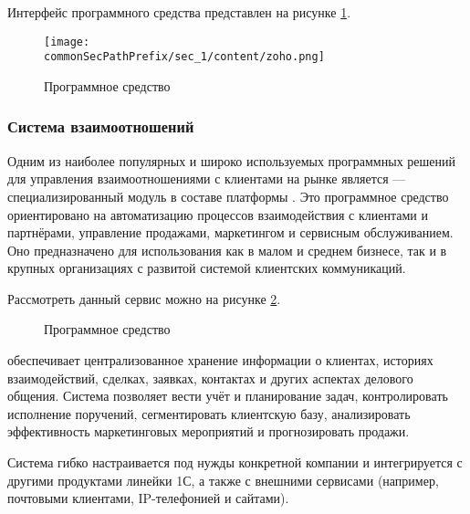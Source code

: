 Интерфейс программного средства представлен на рисунке \ref{fig:zoho}.

\begin{figure}[ht]
    \centering
    \texttt{[image: \\commonSecPathPrefix/sec\_1/content/zoho.png]}
    \caption{Программное средство \analogZoho}
    \label{fig:zoho}
\end{figure}

\subsubsection{Система взаимоотношений \analogOneC}

Одним из наиболее популярных и широко используемых программных решений для управления взаимоотношениями с клиентами на 
рынке является {\analogOneC} — специализированный модуль в составе платформы \analogOneCMain. Это программное средство ориентировано 
на автоматизацию процессов взаимодействия с клиентами и партнёрами, управление продажами, маркетингом и сервисным обслуживанием. 
Оно предназначено для использования как в малом и среднем бизнесе, так и в крупных организациях с развитой системой клиентских 
коммуникаций.

Рассмотреть данный сервис можно на рисунке \ref{fig:onec}.

\begin{figure}[ht]
    \centering
    \caption{Программное средство \analogOneC}
    \label{fig:onec}
\end{figure}

{\analogOneC} обеспечивает централизованное хранение информации о клиентах, историях взаимодействий, сделках, заявках, контактах и других
аспектах делового общения. Система позволяет вести учёт и планирование задач, контролировать исполнение поручений, сегментировать
клиентскую базу, анализировать эффективность маркетинговых мероприятий и прогнозировать продажи.

Система гибко настраивается под нужды конкретной компании и интегрируется с другими продуктами линейки 1С, а также с внешними сервисами 
(например, почтовыми клиентами, IP-телефонией и сайтами).